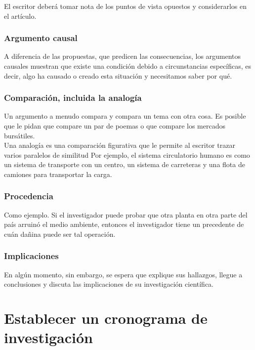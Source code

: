 El escritor deberá tomar nota de los puntos de vista opuestos y considerarlos en el artículo.

\subsubsection{Argumento causal}
A diferencia de las propuestas, que predicen las consecuencias, los argumentos causales muestran que existe una condición debido a circunstancias específicas, es decir, algo ha causado o creado esta situación y necesitamos saber por qué.

\subsubsection{Comparación, incluida la analogía}
Un argumento a menudo compara y compara un tema con otra cosa. Es posible que le pidan que compare un par de poemas o que compare los mercados bursátiles.\\
Una analogía es una comparación figurativa que le permite al escritor trazar varios paralelos de similitud Por ejemplo, el sistema circulatorio humano es como un sistema de transporte con un centro, un sistema de carreteras y una flota de camiones para transportar la carga.

\subsubsection{Procedencia}
Como ejemplo. Si el investigador puede probar que otra planta en otra parte del país arruinó el medio ambiente, entonces el investigador tiene un precedente de cuán dañina puede ser tal operación.

\subsubsection{Implicaciones}
En algún momento, sin embargo, se espera que explique sus hallazgos, llegue a conclusiones y discuta las implicaciones de su investigación científica.

\section{Establecer un cronograma de investigación}

